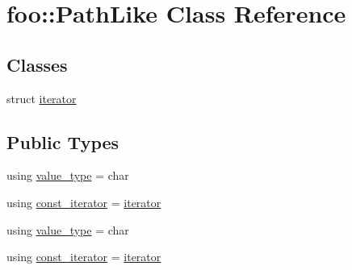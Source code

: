 \hypertarget{classfoo_1_1_path_like}{}\section{foo\+::Path\+Like Class Reference}
\label{classfoo_1_1_path_like}
\subsection*{Classes}
\begin{DoxyCompactItemize}
\item 
struct \mbox{\hyperlink{structfoo_1_1_path_like_1_1iterator}{iterator}}
\end{DoxyCompactItemize}
\subsection*{Public Types}
\begin{DoxyCompactItemize}
\item 
using \mbox{\hyperlink{classfoo_1_1_path_like_aa828aab5ad4071dddf489067e7e06c5e}{value\+\_\+type}} = char
\item 
using \mbox{\hyperlink{classfoo_1_1_path_like_adada0ee7aeec173026717604e6264b4c}{const\+\_\+iterator}} = \mbox{\hyperlink{structfoo_1_1_path_like_1_1iterator}{iterator}}
\item 
using \mbox{\hyperlink{classfoo_1_1_path_like_aa828aab5ad4071dddf489067e7e06c5e}{value\+\_\+type}} = char
\item 
using \mbox{\hyperlink{classfoo_1_1_path_like_adada0ee7aeec173026717604e6264b4c}{const\+\_\+iterator}} = \mbox{\hyperlink{structfoo_1_1_path_like_1_1iterator}{iterator}}
\end{DoxyCompactItemize}
